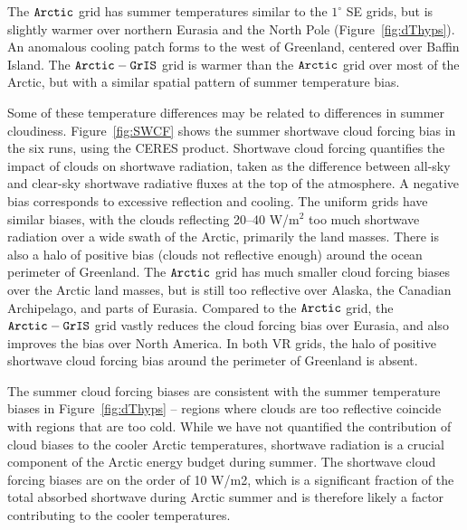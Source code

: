 \documentclass[draft]{agujournal2019}
\begin{document}
The $\tt Arctic$ grid has summer temperatures similar to the $1^{\circ}$ SE grids, but is slightly warmer over northern Eurasia and the North Pole (Figure~\ref{fig:dThyps}). An anomalous cooling patch forms to the west of Greenland, centered over Baffin Island. The $\tt Arctic-GrIS$ grid is warmer than the $\tt Arctic$ grid over most of the Arctic, but with a similar spatial pattern of summer temperature bias.

Some of these temperature differences may be related to differences in summer cloudiness. Figure~\ref{fig:SWCF} shows the summer shortwave cloud forcing bias in the six runs, using the CERES product. Shortwave cloud forcing quantifies the impact of clouds on shortwave radiation, taken as the difference between all-sky and clear-sky shortwave radiative fluxes at the top of the atmosphere. A negative bias corresponds to excessive reflection and cooling. The uniform grids have similar biases, with the clouds reflecting 20--40 W/m$^2$ too much shortwave radiation over a wide swath of the Arctic, primarily the land masses. There is also a halo of positive bias (clouds not reflective enough) around the ocean perimeter of Greenland. The $\tt Arctic$ grid has much smaller cloud forcing biases over the Arctic land masses, but is still too reflective over Alaska, the Canadian Archipelago, and parts of Eurasia.  Compared to the $\tt Arctic$ grid, the $\tt Arctic-GrIS$ grid vastly reduces the cloud forcing bias over Eurasia, and also improves the bias over North America. In both VR grids, the halo of positive shortwave cloud forcing bias around the perimeter of Greenland is absent.

The summer cloud forcing biases are consistent with the summer temperature biases in Figure~\ref{fig:dThyps} -- regions where clouds are too reflective coincide with regions that are too cold. While we have not quantified the contribution of cloud biases to the cooler Arctic temperatures, shortwave radiation is a crucial component of the Arctic energy budget during summer. The shortwave cloud forcing biases are on the order of 10 W/m2, which is a significant fraction of the total absorbed shortwave during Arctic summer  \cite{SETAL2007JGR} and is therefore likely a factor contributing to the cooler temperatures.
\end{document}
